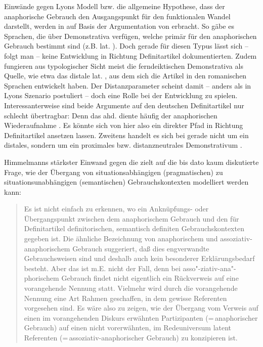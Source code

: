 Einwände gegen Lyons Modell bzw. die allgemeine Hypothese, dass der anaphorische Gebrauch den Ausgangspunkt für den funktionalen Wandel darstellt, werden in 
\textcite[527]{deMulder2011} auf Basis der Argumentation von \textcite[96--98]{Himmelmann1997} erbracht. So gäbe es Sprachen, die über Demonstrativa verfügen, welche primär für den anaphorischen Gebrauch bestimmt sind (z.B. lat. ). Doch gerade für diesen Typus lässt sich -- folgt man \textcite[98]{Himmelmann1997} -- keine Entwicklung in Richtung Definitartikel dokumentierten.  Zudem fungieren aus typologischer Sicht meist die ferndeiktischen Demonstrativa als Quelle, wie etwa das distale lat. , aus dem sich die Artikel in den romanischen Sprachen entwickelt haben. Der Distanzparameter scheint damit -- anders als in Lyons Szenario postuliert -- doch eine Rolle bei der Entwicklung zu spielen. Interessanterweise sind beide Argumente auf den deutschen Definitartikel nur schlecht übertragbar: Denn das ahd.  diente häufig der anaphorischen Wiederaufnahme  \parencite[z.B.][]{Jager1917, Jager1918,Oubouzar1992,Leiss2000}. Es könnte sich von hier also ein direkter Pfad in Richtung Definitartikel ansetzen lassen. Zweitens handelt es sich bei  gerade nicht um ein distales, sondern um ein proximales bzw. distanzneutrales Demonstrativum . 


Himmelmanns stärkster Einwand gegen die  zielt auf die bis dato kaum diskutierte Frage, wie der Übergang von situationsabhängigen (pragmatischen) zu situationsunabhängigen (semantischen) Gebrauchskontexten modelliert werden kann: \blockcquote[94]{Himmelmann1997}{Es ist nicht einfach zu erkennen, wo ein Anknüpfungs- oder Übergangspunkt zwischen dem anaphorischem Gebrauch und den für Definitartikel definitorischen, semantisch definiten Gebrauchskontexten gegeben ist. Die ähnliche Bezeichnung von anaphorischem und assoziativ-anaphorischem Gebrauch suggeriert, daß dies engverwandte Gebrauchsweisen sind und deshalb auch kein besonderer Erklärungsbedarf besteht. Aber das ist m.E. nicht der Fall, denn bei asso"-ziativ-ana"-phorischem Gebrauch findet nicht eigentlich ein Rückverweis auf eine
vorangehende Nennung statt. Vielmehr wird durch die vorangehende Nennung eine Art Rahmen geschaffen, in dem gewisse Referenten vorgesehen sind. 
Es wäre also zu zeigen, wie der Übergang vom Verweis auf einen
im vorangehenden Diskurs erwähnten Partizipanten (=\,anaphorischer Gebrauch) auf einen
nicht vorerwähnten, im Redeuniversum latent  Referenten (=\,assoziativ-anaphorischer Gebrauch) zu konzipieren ist.}

